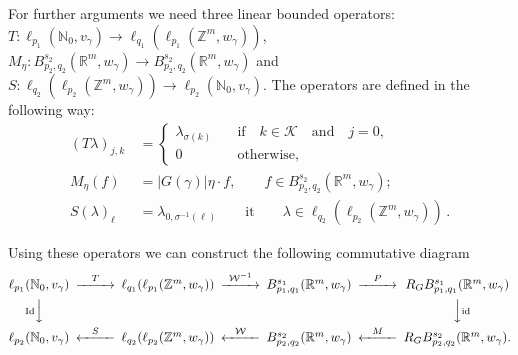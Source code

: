 \documentclass[12pt]{article}
\def\id{\mathop{\rm id \,}\nolimits}
\def\Id{\mathop{\rm Id}\nolimits}
\newcommand{\R}{{\mathbb R}}
\newcommand{\N}{{\mathbb N}}
\newcommand{\Z}{\mathbb Z}
\begin{document}
For  further arguments we need three linear bounded  operators: $T:\ell_{p_1}(\N_0,v_\gamma)\rightarrow \ell_{q_1}(\ell_{p_1}(\Z^m, w_\gamma))$, $M_\eta: B^{s_2}_{p_2,q_2}(\R^m, w_\gamma)\rightarrow B^{s_2}_{p_2,q_2}(\R^m, w_\gamma)$ and $S:\ell_{q_2}(\ell_{p_2}(\Z^m, w_\gamma))\rightarrow \ell_{p_2}(\N_0,v_\gamma)$. The operators are defined in the following way:
\begin{align*}
(T\lambda)_{j,k} &\, = \begin{cases}
\lambda_{\sigma(k)}& \quad\text{if}\quad k\in \mathcal{K}\quad \text{and}\quad j=0,\\
0 & \quad \text{otherwise},
\end{cases}
\\
M_\eta(f) &\, = |G(\gamma)| \eta \cdot f, \qquad f\in  B^{s_2}_{p_2,q_2}(\R^m, w_\gamma) ; \\
S(\lambda)_\ell &\, = \lambda_{0, \sigma^{-1}(\ell)} \qquad \text{it}\qquad \lambda\in  \ell_{q_2}(\ell_{p_2}(\Z^m, w_\gamma))\, .
\end{align*}


Using these operators we can construct the following commutative diagram 
\begin{equation}\label{diag230317}\nonumber 
\begin{CD}
\ell_{p_1}(\N_0,v_\gamma)@>{T}>> \ell_{q_1}(\ell_{p_1}(\Z^m, w_\gamma))     @>{\mathcal{W}^{-1}}>> B^{s_1}_{p_1,q_1}(\R^m, w_\gamma) @ >{P}>>  R_GB^{s_1}_{p_1,q_1}(\R^m, w_\gamma) \\ %
@V{\Id}VV     &{} &{} &{}  &{}                                                        @VV{\id}V\\
\ell_{p_2}(\N_0,v_\gamma)@<S<<  \ell_{q_2}(\ell_{p_2}(\Z^m, w_\gamma)) @<{\mathcal{W}}<< B^{s_2}_{p_2,q_2}(\R^m, w_\gamma) @ <{M}<<  R_GB^{s_2}_{p_2,q_2}(\R^m, w_\gamma).%
\end{CD}
\end{equation}
\end{document}
